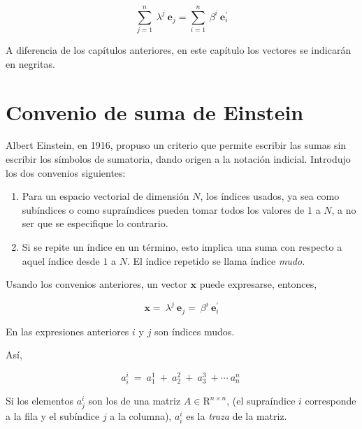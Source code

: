 $$\sum_{j=1}^n~\lambda^j~\mathbf{e}_j=\sum_{i=1}^n~\beta^i~\mathbf{e}^{\prime}_i$$
\begin{remark}
A diferencia de los capítulos anteriores, en este capítulo los vectores se indicarán en negritas.
\end{remark}


\section{Convenio de suma de Einstein}
\label{Convenio}
Albert Einstein, en 1916,  propuso un criterio que permite  escribir las sumas sin escribir los símbolos de sumatoria, dando origen a la notación indicial. Introdujo los dos convenios siguientes:  

\bigskip

\begin{enumerate}

\item Para un espacio vectorial de dimensión $N$, los índices  usados, ya sea como subíndices o como supraíndices pueden tomar todos los valores de $1$ a $N$, a no ser que se especifique lo contrario.

\item Si se repite un índice en un término, esto implica una suma con respecto a aquel índice desde $1$ a $N$. El índice repetido se llama índice \textit{mudo}.

\end{enumerate}

\bigskip

Usando los convenios anteriores, un vector  $\mathbf{x}$ puede  expresarse, entonces, 

\bigskip

$$\mathbf{x}=~\lambda^j~\mathbf{e}_j=~\beta^i~\mathbf{e}^{\prime}_i$$

\bigskip
En las expresiones anteriores $i$ y $j$ son índices mudos.

Así,


$$a_i^i~=~a_1^1~+~a_2^2~+~a_3^3~+\cdots~a_n^n~$$

\bigskip

Si los elementos $a_j^i$ son los de una matriz $ A \in \mathrm{R}^{n \times n}$,  (el supraíndice $i$ corresponde a la fila y el subíndice $j$ a la columna),  $a_i^i$ es la \textit{traza } de la matriz.

\bigskip



